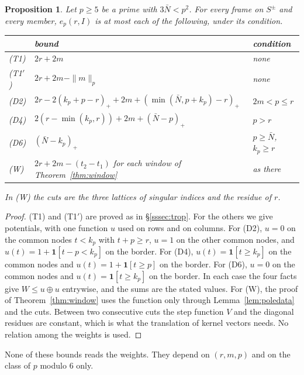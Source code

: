 \documentclass[11pt]{amsart}
\newtheorem{proposition}[theorem]{Proposition}
\theoremstyle{definition}
\theoremstyle{remark}
\numberwithin{equation}{section}
\begin{document}
\begin{proposition}\label{prop:planelocal}
Let $p\ge5$ be a prime with $3\bar N<p^2$. For every frame on $S^\pm$ and every member, $e_p(r,I)$ is at most each of
the following, under its condition.
\begin{center}
{\renewcommand{\arraystretch}{1.2}
\begin{tabular}{@{}lp{}p{}@{}}
\toprule
 & bound & condition\\
\midrule
(T1) & $2r+2m$ & none\\
(T1$'$) & $2r+2m-\|m\|_p$ & none\\
(D2) & $2r-2(k_p+p-r)_++2m+(\min(\bar N,p+k_p)-r)_+$ & $2m<p\le r$\\
(D4) & $2(r-\min(k_p,r))+2m+(\bar N-p)_+$ & $p>r$\\
(D6) & $(\bar N-k_p)_+$ & $p\ge\bar N$, $k_p\ge r$\\
(W) & $2r+2m-(t_2-t_1)$ for each window of Theorem~\ref{thm:window} & as there\\
\bottomrule
\end{tabular}}
\end{center}
In (W) the cuts are the three lattices of singular indices and the residue of $r$.
\end{proposition}
\begin{proof}
(T1) and (T1$'$) are proved as in \S\ref{sssec:trop}. For the others we give potentials, with one function $u$ used on
rows and on columns. For (D2), $u=0$ on the common nodes $t<k_p$ with $t+p\ge r$, $u=1$ on the other common nodes,
and $u(t)=1+\mathbf 1[t-p<k_p]$ on the border. For (D4), $u(t)=\mathbf 1[t\ge k_p]$ on the common nodes and
$u(t)=1+\mathbf 1[t\ge p]$ on the border. For (D6), $u=0$ on the common nodes and $u(t)=\mathbf 1[t\ge k_p]$ on the
border. In each case the four facts give $W\le u\oplus u$ entrywise, and the sums are the stated values. For (W), the
proof of Theorem~\ref{thm:window} uses the function only through Lemma~\ref{lem:poledata} and the cuts. Between two
consecutive cuts the step function $V$ and the diagonal residues are constant, which is what the translation of
kernel vectors needs. No relation among the weights is used.
\end{proof}

None of these bounds reads the weights. They depend on $(r,m,p)$ and on the class of $p$ modulo $6$ only.
\end{document}
